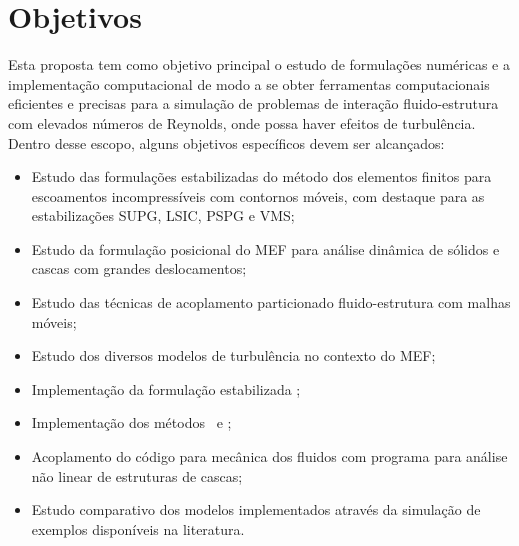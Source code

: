 
\section{Objetivos}

Esta proposta tem como objetivo principal o estudo de formulações numéricas e a implementação computacional de modo a se obter ferramentas computacionais eficientes e precisas para a simulação de problemas de interação fluido-estrutura com elevados números de Reynolds, onde possa haver efeitos de turbulência. Dentro desse escopo, alguns objetivos específicos devem ser alcançados:

\begin{itemize}
    \item Estudo das formulações estabilizadas do método dos elementos finitos para escoamentos incompressíveis com contornos móveis, com destaque para as estabilizações SUPG, LSIC, PSPG e VMS;

    \item Estudo da formulação posicional do MEF para análise dinâmica de sólidos e cascas com grandes deslocamentos;

    \item Estudo das técnicas de acoplamento particionado fluido-estrutura com malhas móveis;

    \item Estudo dos diversos modelos de turbulência no contexto do MEF;

    \item Implementação da formulação estabilizada \VMS;

    \item Implementação dos métodos \RANS\ e \LES;

    \item Acoplamento do código para mecânica dos fluidos com programa para análise não linear de estruturas de cascas;

    \item Estudo comparativo dos modelos implementados através da simulação de exemplos disponíveis na literatura.
\end{itemize}

